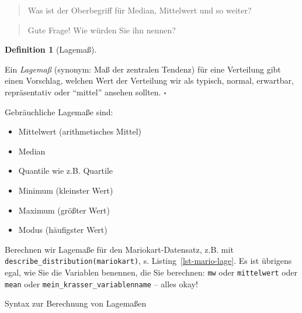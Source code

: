 \documentclass[
  letterpaper,
  twoside,
  open=any]{scrbook}
\newenvironment{Shaded}{\begin{snugshade}}{\end{snugshade}}
\newcommand{\CommentTok}[1]{\textcolor[rgb]{0.37,0.37,0.37}{#1}}
\newcommand{\FunctionTok}[1]{\textcolor[rgb]{0.28,0.35,0.67}{#1}}
\newcommand{\NormalTok}[1]{\textcolor[rgb]{0.00,0.23,0.31}{#1}}
\newcommand{\SpecialCharTok}[1]{\textcolor[rgb]{0.37,0.37,0.37}{#1}}
\providecommand{\tightlist}{%
  \setlength{\itemsep}{0pt}\setlength{\parskip}{0pt}}\usepackage{longtable,booktabs,array}
\theoremstyle{definition}
\theoremstyle{definition}
\theoremstyle{definition}
\newtheorem{definition}{Definition}[chapter]
\theoremstyle{remark}
\begin{document}
\begin{quote}
{} Was ist der Oberbegriff für Median, Mittelwert und so
weiter?
\end{quote}

\begin{quote}
{} Gute Frage! Wie würden Sie ihn nennen?
\end{quote}

\begin{definition}[Lagemaß]\protect\hypertarget{def-lage}{}\label{def-lage}

Ein \emph{Lagemaß} (synonym: Maß der zentralen Tendenz) für eine
Verteilung gibt einen Vorschlag, welchen Wert der Verteilung wir als
typisch, normal, erwartbar, repräsentativ oder \enquote{mittel} ansehen
sollten. \(\square\)

\end{definition}

Gebräuchliche Lagemaße sind:

\begin{itemize}
\tightlist
\item
  Mittelwert (arithmetisches Mittel)
\item
  Median
\item
  Quantile wie z.B. Quartile
\item
  Minimum (kleinster Wert)
\item
  Maximum (größter Wert)
\item
  Modus (häufigster Wert)
\end{itemize}

Berechnen wir Lagemaße für den Mariokart-Datensatz, z.B. mit
\texttt{describe\_distribution(mariokart)}, s.
Listing~\ref{lst-mario-lage}. Es ist übrigens egal, wie Sie die
Variablen benennen, die Sie berechnen: \texttt{mw} oder
\texttt{mittelwert} oder \texttt{mean} oder
\texttt{mein\_krasser\_variablenname} -- alles okay!

\begin{codelisting}

\caption{\label{lst-mario-lage}Syntax zur Berechnung von Lagemaßen}

\centering{

\begin{Shaded}
\begin{Highlighting}[]
\FunctionTok{describe\_distribution}\NormalTok{(mariokart) }\SpecialCharTok{|\textgreater{}}  
  \CommentTok{\# Einige Spalten interessieren uns hier nicht:}
  \FunctionTok{select}\NormalTok{(}\SpecialCharTok{{-}}\NormalTok{Skewness, }\SpecialCharTok{{-}}\NormalTok{Kurtosis, }\SpecialCharTok{{-}}\NormalTok{n, n\_Missing)}
\end{Highlighting}
\end{Shaded}

}

\end{codelisting}%
\end{document}
